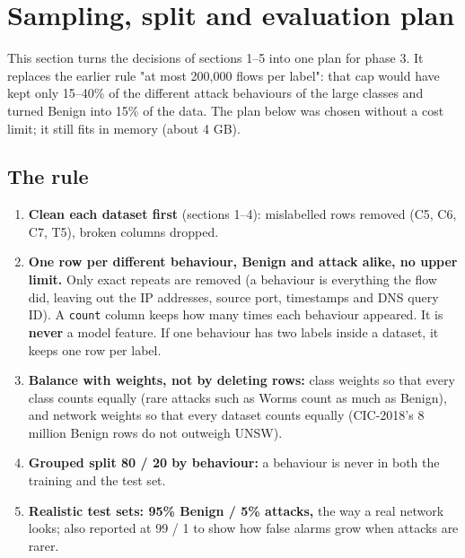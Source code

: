 \documentclass[10pt,a4paper]{article}
\newenvironment{problem}{\par\noindent\begin{minipage}{\linewidth}\setlength{\parskip}{4pt}}{\end{minipage}\par\bigskip}
\begin{document}
\newpage
\section{Sampling, split and evaluation plan}
This section turns the decisions of sections 1--5 into one plan for phase 3. It replaces the earlier rule "at most 200,000 flows per label": that cap would have kept only 15--40\% of the different attack behaviours of the large classes and turned Benign into 15\% of the data. The plan below was chosen without a cost limit; it still fits in memory (about 4 GB).

\begin{problem}\subsection{The rule}
\begin{enumerate}
\item \textbf{Clean each dataset first} (sections 1--4): mislabelled rows removed (C5, C6, C7, T5), broken columns dropped.
\item \textbf{One row per different behaviour, Benign and attack alike, no upper limit.} Only exact repeats are removed (a behaviour is everything the flow did, leaving out the IP addresses, source port, timestamps and DNS query ID). A \texttt{count} column keeps how many times each behaviour appeared. It is \textbf{never} a model feature. If one behaviour has two labels inside a dataset, it keeps one row per label.
\item \textbf{Balance with weights, not by deleting rows:} class weights so that every class counts equally (rare attacks such as Worms count as much as Benign), and network weights so that every dataset counts equally (CIC-2018's 8 million Benign rows do not outweigh UNSW).
\item \textbf{Grouped split 80 / 20 by behaviour:} a behaviour is never in both the training and the test set.
\item \textbf{Realistic test sets: 95\% Benign / 5\% attacks,} the way a real network looks; also reported at 99 / 1 to show how false alarms grow when attacks are rarer.
\end{enumerate}
\end{problem}
\end{document}
